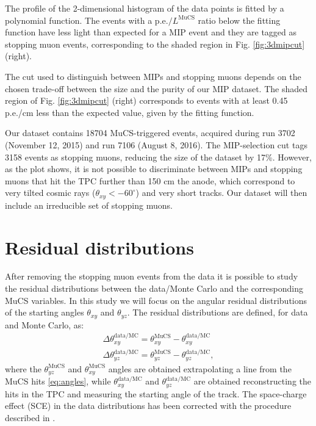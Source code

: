 \documentclass[a4paper]{scrartcl}
\begin{document}
The profile of the 2-dimensional histogram of the data points is fitted by a polynomial function.
The events with a p.e.$/L^{\mathrm{MuCS}}$ ratio below the fitting function have less light than expected for a MIP event and they are tagged as stopping muon events, corresponding to the shaded region in Fig. \ref{fig:3dmipcut} (right). %

The cut used to distinguish between MIPs and stopping muons depends on the chosen trade-off between the size and the purity of our MIP dataset. The shaded region of Fig. \ref{fig:3dmipcut} (right) corresponds to events with at least 0.45 p.e./cm less than the expected value, given by the fitting function. 



Our dataset contains 18704 MuCS-triggered events, acquired during run 3702 (November 12, 2015) and run 7106 (August 8, 2016). The MIP-selection cut tags 3158 events as stopping muons, reducing the size of the dataset by 17\%.
However, as the plot shows, it is not possible to discriminate between MIPs and stopping muons that hit the TPC further than 150 cm the anode, which correspond to very tilted cosmic rays ($\theta_{xy}<-60^{\circ}$) and very short tracks. Our dataset will then include an irreducible set of stopping muons.

\section{Residual distributions} 
After removing the stopping muon events from the data it is possible to study the residual distributions between the data/Monte Carlo and the corresponding MuCS variables. In this study we will focus on the angular residual distributions of the starting angles $\theta_{xy}$ and $\theta_{yz}$. The residual distributions are defined, for data and Monte Carlo, as:
\begin{align*}
\Delta \theta_{xy}^{\mathrm{data/MC}} = \theta_{xy}^{\mathrm{MuCS}} - \theta_{xy}^{\mathrm{data/MC}}\\
\Delta \theta_{yz}^{\mathrm{data/MC}} = \theta_{yz}^{\mathrm{MuCS}} -  \theta_{yz}^{\mathrm{data/MC}},
\end{align*}
where the $\theta_{yz}^{\mathrm{MuCS}}$ and $\theta_{xy}^{\mathrm{MuCS}}$ angles are obtained extrapolating a line from the MuCS hits \eqref{eq:angles}, while $\theta_{xy}^{\mathrm{data/MC}}$ and $\theta_{yz}^{\mathrm{data/MC}}$ are obtained reconstructing the hits in the TPC and measuring the starting angle of the track.
The space-charge effect (SCE) in the data distributions has been corrected with the procedure described in \cite{sce}.
\end{document}
